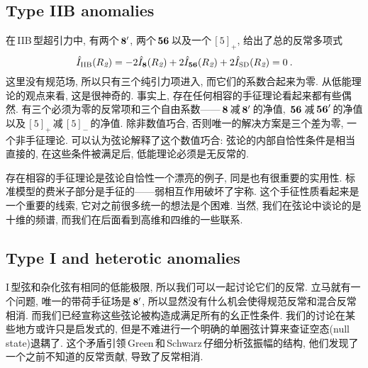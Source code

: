 \subsection*{Type IIB anomalies}
在\,IIB\,型超引力中, 有两个$\,\bf{8}^{\prime}$, 两个$\,\bf{56}\,$以及一个$\,[5]_{+}$, 给出了总的反常多项式
\begin{equation}
    \hat{I}_{\text{IIB}}(R_{\textit{2}}) = -2\hat{I}_{\bf{8}}(R_{\textit{2}}) +2\hat{I}_{\bf{56}}(R_{\textit{2}}) +2\hat{I}_{\text{SD}}(R_{\textit{2}}) =0\:. \label{12.2.14}
\end{equation}
这里没有规范场, 所以只有三个纯引力项进入, 而它们的系数合起来为零. 从低能理论的观点来看, 这是很神奇的. 事实上, 存在任何相容的手征理论看起来都有些偶然. 有三个必须为零的反常项和三个自由系数------$\,\bf{8}\,$减$\,\bf{8}^{\prime}\,$的净值, $\,\bf{56}\,$减$\,\bf{56}^{\prime}\,$的净值以及$\,[5]_{+}\,$减$\,[5]_{-}\,$的净值. 除非数值巧合, 否则唯一的解决方案是三个差为零, 一个非手征理论. 可以认为弦论解释了这个数值巧合: 弦论的内部自恰性条件是相当直接的, 在这些条件被满足后, 低能理论必须是无反常的.

存在相容的手征理论是弦论自恰性一个漂亮的例子, 同是也有很重要的实用性. 标准模型的费米子部分是手征的------弱相互作用破坏了宇称. 这个手征性质看起来是一个重要的线索, 它对之前很多统一的想法是个困难. 当然, 我们在弦论中谈论的是十维的频谱, 而我们在后面看到高维和四维的一些联系.

\subsection*{Type I and heterotic anomalies}

I\,型弦和杂化弦有相同的低能极限, 所以我们可以一起讨论它们的反常. 立马就有一个问题, 唯一的带荷手征场是$\,\bf{8}'$, 所以显然没有什么机会使得规范反常和混合反常相消. 而我们已经宣称这些弦论被构造成满足所有的幺正性条件. 我们的讨论在某些地方或许只是启发式的, 但是不难进行一个明确的单圈弦计算来查证空态(null state)退耦了. 这个矛盾引领\,Green\,和\,Schwarz\,仔细分析弦振幅的结构, 他们发现了一个之前不知道的反常贡献, 导致了反常相消.

